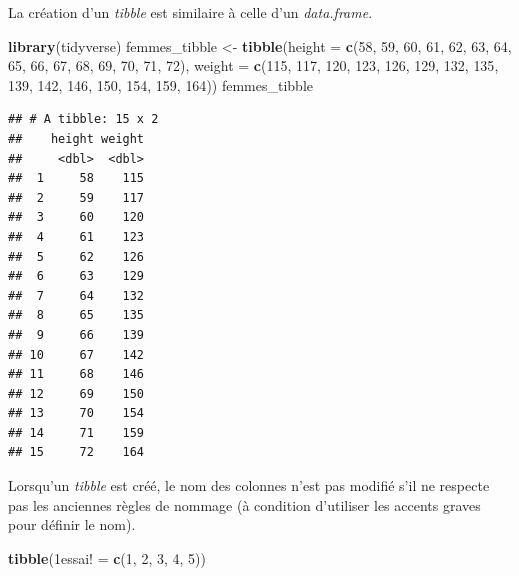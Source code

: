 \documentclass[
  11pt,
]{book}
\newenvironment{Shaded}{\begin{snugshade}}{\end{snugshade}}
\newcommand{\DataTypeTok}[1]{\textcolor[rgb]{0.13,0.29,0.53}{#1}}
\newcommand{\DecValTok}[1]{\textcolor[rgb]{0.00,0.00,0.81}{#1}}
\newcommand{\KeywordTok}[1]{\textcolor[rgb]{0.13,0.29,0.53}{\textbf{#1}}}
\newcommand{\NormalTok}[1]{#1}
\newcommand{\StringTok}[1]{\textcolor[rgb]{0.31,0.60,0.02}{#1}}
\numberwithin{equation}{section}
\numberwithin{countremarque}{section}
\begin{document}
La création d'un \emph{tibble} est similaire à celle d'un \emph{data.frame}.

\begin{Shaded}
\begin{Highlighting}[]
\KeywordTok{library}\NormalTok{(tidyverse)}
\NormalTok{femmes\_tibble \textless{}{-}}\StringTok{ }\KeywordTok{tibble}\NormalTok{(}\DataTypeTok{height =} \KeywordTok{c}\NormalTok{(}\DecValTok{58}\NormalTok{, }\DecValTok{59}\NormalTok{, }\DecValTok{60}\NormalTok{, }\DecValTok{61}\NormalTok{, }\DecValTok{62}\NormalTok{, }\DecValTok{63}\NormalTok{, }\DecValTok{64}\NormalTok{, }\DecValTok{65}\NormalTok{,}
                                \DecValTok{66}\NormalTok{, }\DecValTok{67}\NormalTok{, }\DecValTok{68}\NormalTok{, }\DecValTok{69}\NormalTok{, }\DecValTok{70}\NormalTok{, }\DecValTok{71}\NormalTok{, }\DecValTok{72}\NormalTok{),}
                     \DataTypeTok{weight =} \KeywordTok{c}\NormalTok{(}\DecValTok{115}\NormalTok{, }\DecValTok{117}\NormalTok{, }\DecValTok{120}\NormalTok{, }\DecValTok{123}\NormalTok{, }\DecValTok{126}\NormalTok{, }\DecValTok{129}\NormalTok{, }\DecValTok{132}\NormalTok{,}
                                \DecValTok{135}\NormalTok{, }\DecValTok{139}\NormalTok{, }\DecValTok{142}\NormalTok{, }\DecValTok{146}\NormalTok{, }\DecValTok{150}\NormalTok{, }\DecValTok{154}\NormalTok{, }\DecValTok{159}\NormalTok{, }\DecValTok{164}\NormalTok{))}
\NormalTok{femmes\_tibble}
\end{Highlighting}
\end{Shaded}

\begin{lstlisting}
## # A tibble: 15 x 2
##    height weight
##     <dbl>  <dbl>
##  1     58    115
##  2     59    117
##  3     60    120
##  4     61    123
##  5     62    126
##  6     63    129
##  7     64    132
##  8     65    135
##  9     66    139
## 10     67    142
## 11     68    146
## 12     69    150
## 13     70    154
## 14     71    159
## 15     72    164
\end{lstlisting}

Lorsqu'un \emph{tibble} est créé, le nom des colonnes n'est pas modifié s'il ne respecte pas les anciennes règles de nommage (à condition d'utiliser les accents graves pour définir le nom).

\begin{Shaded}
\begin{Highlighting}[]
\KeywordTok{tibble}\NormalTok{(}\StringTok{\textasciigrave{}}\DataTypeTok{1essai!}\StringTok{\textasciigrave{}}\NormalTok{ =}\StringTok{ }\KeywordTok{c}\NormalTok{(}\DecValTok{1}\NormalTok{, }\DecValTok{2}\NormalTok{, }\DecValTok{3}\NormalTok{, }\DecValTok{4}\NormalTok{, }\DecValTok{5}\NormalTok{))}
\end{Highlighting}
\end{Shaded}
\end{document}
